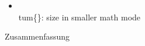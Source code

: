 \label{sec:abstract}
%
\begin{itemize}
   \item \\tum\{\}: size in smaller math mode %
\end{itemize}
%
\vspace*{20mm}
%
{Zusammenfassung}
\label{sec:abstract-ger}
%
